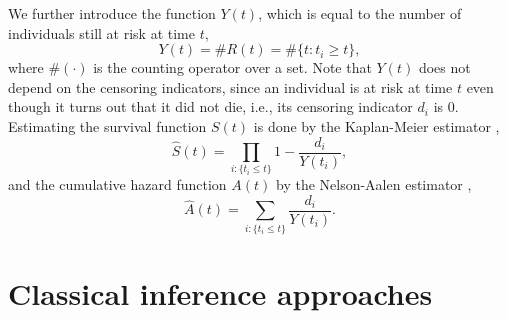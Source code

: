 We further introduce the function $Y(t)$, which is equal to the number of individuals still at risk at time $t$,
\begin{equation*}
    Y(t)=\#R(t)=\#\{t\colon t_i\geq t\},
\end{equation*}
where $\#(\cdot)$ is the counting operator over a set. Note that $Y(t)$ does not depend on the censoring indicators, since
an individual is at risk at time $t$ even though it turns out that it did not die, i.e., its censoring indicator $d_i$ is 0.
Estimating the survival function $S(t)$ is done by the Kaplan-Meier estimator \citep{kaplan-meier},
\begin{equation*}
    \hat{S}(t)=\prod_{i:\{t_i\leq t\}}1-\frac{d_i}{Y(t_i)},
\end{equation*}
and the cumulative hazard function $A(t)$ by the Nelson-Aalen estimator \citep{nelson, aalen1978},
\begin{equation*}
    \hat{A}(t)=\sum_{i:\{t_i\leq t\}}\frac{d_i}{Y(t_i)}.
\end{equation*}

\section{Classical inference approaches}

